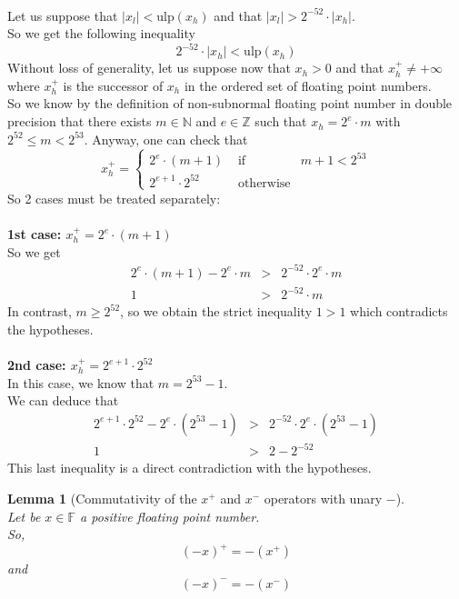 \documentclass[a4paper,10pt,twoside]{article}
\newtheorem{lemma}[theorem]{Lemma}
\newenvironment{proof}[1][Proof]{\begin{trivlist}
\item[\hskip \labelsep {\bfseries #1}]}{\end{trivlist}}
\newcommand{\qed}{\nobreak \ifvmode \relax \else \ifdim \lastskip<1.5em \hskip-\lastskip
\hskip1.5em plus0em minus0.5em \fi \nobreak \vrule height0.75em width0.5em depth0.25em\fi}
\newcommand{\N}{\ensuremath{\mathbb {N}}}
\newcommand{\Z}{\ensuremath{\mathbb {Z}}}
\newcommand{\F}{\ensuremath{\mathbb {F}}}
\newcommand{\hi}{\ensuremath{\mathit{h}}}
\newcommand{\lo}{\ensuremath{\mathit{l}}}
\newcommand{\mUlp}{\ensuremath{\mathrm{ulp}}}
\begin{document}
\begin{proof} ~ \\
Let us suppose that $\left \vert x_\lo \right \vert < \mUlp\left(x_\hi
\right)$ and that 
$\left \vert x_\lo \right \vert > 2^{-52} \cdot \left \vert x_\hi \right \vert$.\\
So we get the following inequality
$$2^{-52} \cdot \left \vert x_\hi \right \vert < \mUlp\left( x_\hi \right)$$
Without loss of generality, let us suppose now that 
$x_\hi > 0$ and that $x_\hi^+ \not = + \infty$ where $x_\hi^+$ is the
successor of 
$x_\hi$ in the ordered set of floating point numbers.\\
So we know by the definition of non-subnormal floating point number in double
precision that there exists
$m \in \N$ and $e \in \Z$ such that
$x_\hi = 2^e \cdot m$ with $2^{52} \leq m < 2^{53}$. Anyway, one can check that
$$x_\hi^+ = \left \lbrace \begin{array}{lll} 2^e \cdot \left(m + 1 \right) & \mbox{ if } & m+1 < 2^{53} \\
                                             2^{e+1} \cdot 2^{52} & \mbox{ otherwise} & \end{array} \right.$$
So 2 cases must be treated separately:\\~\\
{\bf 1st case: $x_\hi^+ = 2^e \cdot \left( m + 1 \right)$} \\ 
So we get
\begin{eqnarray*}
2^e \cdot \left( m + 1 \right) - 2^e \cdot m & > & 2^{-52} \cdot 2^e \cdot m \\
1 & > &  2^{-52} \cdot m 
\end{eqnarray*}
In contrast, $m \geq 2^{52}$, so we obtain the strict inequality $1 > 1$
which contradicts the hypotheses. \\~\\
{\bf 2nd case: $x_\hi^+ = 2^{e+1} \cdot 2^{52}$} \\ 
In this case, we know that $m=2^{53} - 1$. \\
We can deduce that 
\begin{eqnarray*}
2^{e+1} \cdot 2^{52} - 2^e \cdot \left( 2^{53} - 1\right) & > & 2^{-52} \cdot 2^e \cdot \left( 2^{53} - 1 \right) \\
1 & > &  2 - 2^{-52}
\end{eqnarray*}
This last inequality is a direct contradiction with the hypotheses.\qed
\end{proof}
\begin{lemma}[Commutativity of the $x^+$ and $x^-$ operators with unary $-$] \label{commut} ~ \\
Let be $x \in \F$ a positive floating point number.\\
So, 
$$\left( - x\right)^+ = -\left(x^+\right)$$
and
$$\left( - x\right)^- = -\left(x^-\right)$$
\end{lemma}
\end{document}
